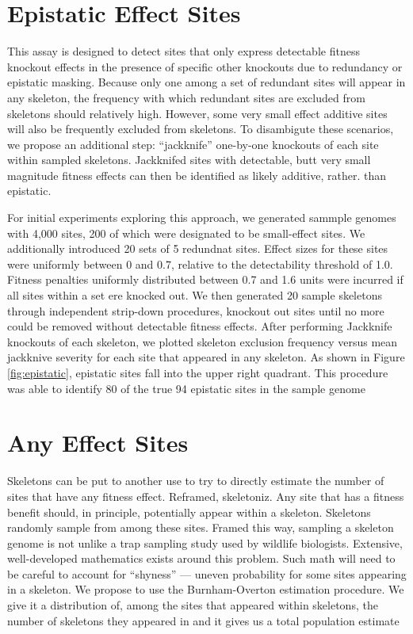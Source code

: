 \section{Epistatic Effect Sites}



This assay is designed to detect sites that only express detectable fitness knockout effects in the presence of specific other knockouts due to redundancy or epistatic masking.
Because only one among a set of redundant sites will appear in any skeleton, the frequency with which redundant sites are excluded from skeletons should relatively high.
However, some very small effect additive sites will also be frequently excluded from skeletons.
To disambigute these scenarios, we propose an additional step: ``jackknife'' one-by-one knockouts of each site within sampled skeletons.
Jackknifed sites with detectable, butt very small magnitude fitness effects can then be identified as likely additive,  rather. than epistatic.

For initial experiments exploring this approach, we generated sammple genomes with 4,000 sites, 200 of which were designated to be small-effect sites.
We additionally introduced 20 sets of 5 redundnat sites.
Effect sizes for these sites were uniformly between 0 and 0.7, relative to the detectability threshold of 1.0.
Fitness penalties uniformly distributed between 0.7 and 1.6 units were incurred if all sites within a set ere knocked out.
We then generated 20 sample skeletons through independent strip-down procedures, knockout out sites until no more could be removed without detectable fitness effects.
After performing Jackknife knockouts of each skeleton, we plotted skeleton exclusion frequency versus mean jackknive severity for each site that appeared in any skeleton.
As shown in Figure \ref{fig:epistatic}, epistatic sites fall into the upper right quadrant.
This procedure was able to identify 80 of the true 94 epistatic sites in the sample genome

\section{Any Effect Sites}

Skeletons can be put to another use to try to directly estimate the number of sites that have any fitness effect.
Reframed, skeletoniz.
Any site that has a fitness benefit should, in principle, potentially appear within a skeleton.
Skeletons randomly sample from among these sites.
Framed this way, sampling a skeleton genome is not unlike a trap sampling study used by wildlife biologists.
Extensive, well-developed mathematics exists around this problem.
Such math will need to be careful to account for ``shyness'' --- uneven probability for some sites appearing in a skeleton.
We propose to use the Burnham-Overton estimation procedure.
We give it a distribution of, among the sites that appeared within skeletons, the number of skeletons they appeared in and it gives us a total population estimate

